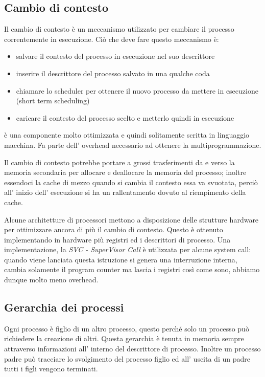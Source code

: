 \subsection{Cambio di contesto}
Il cambio di contesto è un meccanismo utilizzato per cambiare il processo correntemente in esecuzione.
Ciò che deve fare questo meccanismo è:
\begin{itemize}
    \item salvare il contesto del processo in esecuzione nel suo descrittore 
    \item inserire il descrittore del processo salvato in una qualche coda
    \item chiamare lo scheduler per ottenere il nuovo processo da mettere in esecuzione (short term scheduling)
    \item caricare il contesto del processo scelto e metterlo quindi in esecuzione
\end{itemize}
è una componente molto ottimizzata e quindi solitamente scritta in linguaggio macchina.
Fa parte dell' overhead necessario ad ottenere la multiprogrammazione.

Il cambio di contesto potrebbe portare a grossi trasferimenti da e verso la memoria secondaria per allocare e deallocare la memoria del processo; inoltre essendoci la cache di mezzo quando si cambia il contesto essa va svuotata, perciò all' inizio dell' esecuzione si ha un rallentamento dovuto al riempimento della cache.

Alcune architetture di processori mettono a disposizione delle strutture hardware per ottimizzare ancora di più il cambio di contesto.
Questo è ottenuto implementando in hardware più registri ed i descrittori di processo.
Una implementazione, la \emph{SVC - SuperVisor Call} è utilizzata per alcune system call: quando viene lanciata questa istruzione si genera una interruzione interna, cambia solamente il program counter ma lascia i registri così come sono, abbiamo dunque molto meno overhead.

\subsection{Gerarchia dei processi}
Ogni processo è figlio di un altro processo, questo perché solo un processo può richiedere la creazione di altri. Questa gerarchia è tenuta in memoria sempre attraverso informazioni all' interno del descrittore di processo.
Inoltre un processo padre può tracciare lo svolgimento del processo figlio ed all' uscita di un padre tutti i figli vengono terminati.

